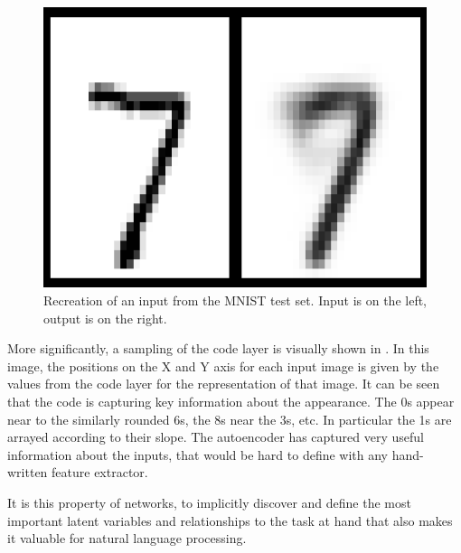 \documentclass[12pt,parskip]{komatufte}
\begin{document}
\begin{figure}
	\caption{Recreation of an input from the MNIST test set. Input is on the left, output is on the right.}
	\label{fig-ae-recreation}
	\centering
	\includegraphics[scale=0.40]{figs/chapterintromachinelearning/recreation}
\end{figure}


More significantly, a sampling of the code layer is visually shown in .
In this image, the positions on the X and Y axis for each input image is given by the values from the code layer for the representation of that image.
It can be seen that the code is capturing key information about the appearance.
The 0s appear near to the similarly rounded 6s,
the 8s near the 3s, etc.
In particular the 1s are arrayed according to their slope.
The autoencoder has captured very useful information about the inputs, that would be hard to define with any hand-written feature extractor.

It is this property of networks, to implicitly discover and define the most important latent variables and relationships to the task at hand that also makes it valuable for natural language processing.



\printbib
\end{document}
